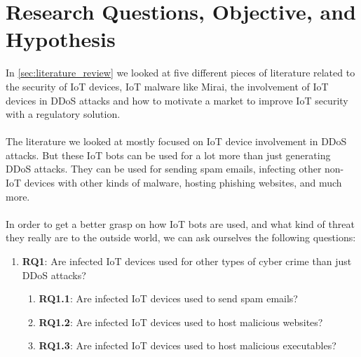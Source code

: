 \documentclass[a4paper,10pt]{article}
\begin{document}

\section{Research Questions, Objective, and Hypothesis} \label{sec:research_questions}
% 
In \autoref{sec:literature_review} we looked at five different pieces of literature related to the security of IoT 
devices, IoT malware like Mirai, the involvement of IoT devices in DDoS attacks and how to motivate a market
to improve IoT security with a regulatory solution.
\\\\
The literature we looked at mostly focused on IoT device involvement in DDoS attacks. But these IoT bots can
be used for a lot more than just generating DDoS attacks. They can be used for sending spam emails, infecting
other non-IoT devices with other kinds of malware, hosting phishing websites, and much more. 
\\\\
In order to get a better grasp on how IoT bots are used, and what kind of threat they really are to the outside
world,  we can ask ourselves the following questions:
\begin{enumerate}
 \item[] \textbf{RQ1}: Are infected IoT devices used for other types of cyber crime than just DDoS attacks? \label{rq1}
 \begin{enumerate}
  \item[] \textbf{RQ1.1}: Are infected IoT devices used to send spam emails? \label{rq11}
  \item[] \textbf{RQ1.2}: Are infected IoT devices used to host malicious websites? \label{rq12}
  \item[] \textbf{RQ1.3}: Are infected IoT devices used to host malicious executables? \label{rq13}
 \end{enumerate}
\end{enumerate}
\end{document}
